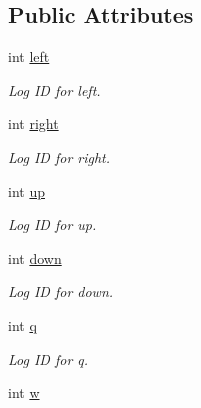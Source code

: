 \subsection*{Public Attributes}
\begin{DoxyCompactItemize}
\item 
int \hyperlink{classInput_aa5becba821fbe9c146c332091ebcc6f2}{left}\hypertarget{classInput_aa5becba821fbe9c146c332091ebcc6f2}{}\label{classInput_aa5becba821fbe9c146c332091ebcc6f2}

\begin{DoxyCompactList}\small\item\em Log ID for left. \end{DoxyCompactList}\item 
int \hyperlink{classInput_a481ae9265fafe80dad6850a24980bfb5}{right}\hypertarget{classInput_a481ae9265fafe80dad6850a24980bfb5}{}\label{classInput_a481ae9265fafe80dad6850a24980bfb5}

\begin{DoxyCompactList}\small\item\em Log ID for right. \end{DoxyCompactList}\item 
int \hyperlink{classInput_ad83fb715e39bdc509caf1c2bb7bf692d}{up}\hypertarget{classInput_ad83fb715e39bdc509caf1c2bb7bf692d}{}\label{classInput_ad83fb715e39bdc509caf1c2bb7bf692d}

\begin{DoxyCompactList}\small\item\em Log ID for up. \end{DoxyCompactList}\item 
int \hyperlink{classInput_a24c4a5d08fb4de9300931efb8e7787fb}{down}\hypertarget{classInput_a24c4a5d08fb4de9300931efb8e7787fb}{}\label{classInput_a24c4a5d08fb4de9300931efb8e7787fb}

\begin{DoxyCompactList}\small\item\em Log ID for down. \end{DoxyCompactList}\item 
int \hyperlink{classInput_ad1b648983bba177348f968e05dccfb4a}{q}\hypertarget{classInput_ad1b648983bba177348f968e05dccfb4a}{}\label{classInput_ad1b648983bba177348f968e05dccfb4a}

\begin{DoxyCompactList}\small\item\em Log ID for q. \end{DoxyCompactList}\item 
int \hyperlink{classInput_a50cd82a148ff2ee1bd6f1692277ae5d2}{w}\hypertarget{classInput_a50cd82a148ff2ee1bd6f1692277ae5d2}{}\label{classInput_a50cd82a148ff2ee1bd6f1692277ae5d2}


\end{DoxyCompactItemize}
